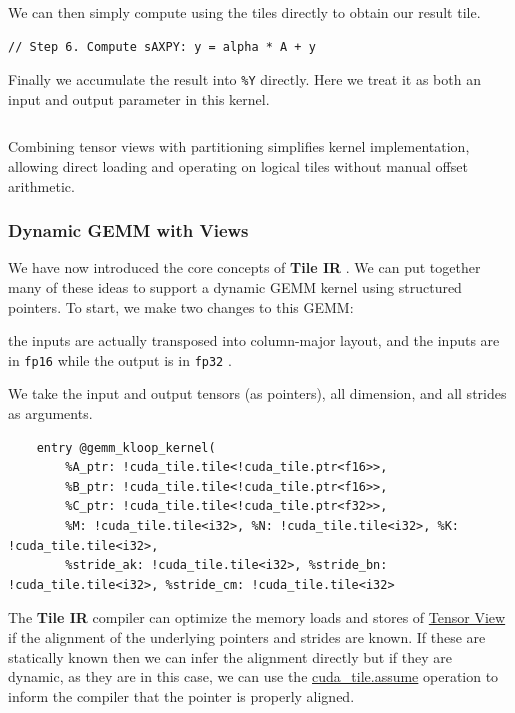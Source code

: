 \documentclass{article}
\begin{document}
We can then simply compute using the tiles directly to obtain our result tile.


\begin{lstlisting}
// Step 6. Compute sAXPY: y = alpha * A + y
\end{lstlisting}

Finally we accumulate the result into \texttt{\%Y} directly. Here we treat it as both an input and output parameter in this kernel.


\begin{lstlisting}
\end{lstlisting}

Combining tensor views with partitioning simplifies kernel implementation, allowing direct loading and operating on logical tiles without manual offset arithmetic.



\subsubsection{Dynamic GEMM with Views}

We have now introduced the core concepts of \textbf{Tile IR} . We can put together many of these ideas to support a dynamic GEMM kernel using structured pointers. To start, we make two changes to this GEMM:

the inputs are actually transposed into column-major layout, and the inputs are in \texttt{fp16} while the output is in \texttt{fp32} .


We take the input and output tensors (as pointers), all dimension, and all strides as arguments.


\begin{lstlisting}
    entry @gemm_kloop_kernel(
        %A_ptr: !cuda_tile.tile<!cuda_tile.ptr<f16>>,
        %B_ptr: !cuda_tile.tile<!cuda_tile.ptr<f16>>,
        %C_ptr: !cuda_tile.tile<!cuda_tile.ptr<f32>>,
        %M: !cuda_tile.tile<i32>, %N: !cuda_tile.tile<i32>, %K: !cuda_tile.tile<i32>,
        %stride_ak: !cuda_tile.tile<i32>, %stride_bn: !cuda_tile.tile<i32>, %stride_cm: !cuda_tile.tile<i32>
\end{lstlisting}

The \textbf{Tile IR} compiler can optimize the memory loads and stores of \href{https://docs.nvidia.com/cuda/tile-ir/latest/sections/types.html#type-tensor-view}{Tensor View} if the alignment of the underlying pointers and strides are known. If these are statically known then we can infer the alignment directly but if they are dynamic, as they are in this case, we can use the \href{https://docs.nvidia.com/cuda/tile-ir/latest/sections/operations.html#op-cuda-tile-assume}{cuda\_tile.assume} operation to inform the compiler that the pointer is properly aligned.
\end{document}
